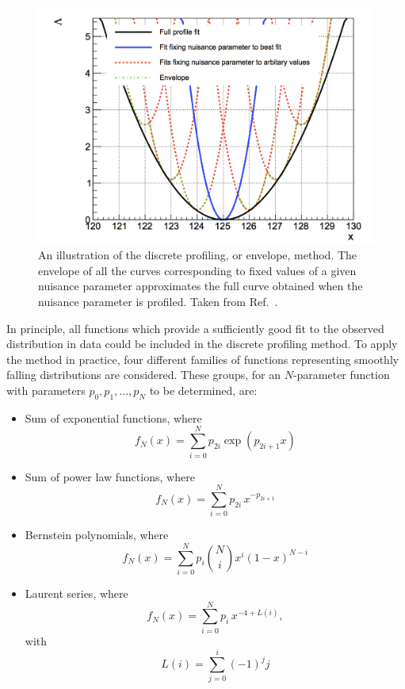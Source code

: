 \begin{figure}[hptb]
\centering
\includegraphics[width=\textwidth]{Figures/SigBkg/EnvelopeIllustration.pdf}
\caption{
  An illustration of the discrete profiling, or envelope, method.
  The envelope of all the curves corresponding to fixed values of a given nuisance parameter
  approximates the full curve obtained when the nuisance parameter is profiled.
  Taken from Ref.~\cite{Envelope}.
}
\label{fig:sigbkg_envelope}
\end{figure}

In principle, all functions which provide a sufficiently good fit to the observed \mgg distribution
in data could be included in the discrete profiling method.
To apply the method in practice, 
four different families of functions representing smoothly falling distributions are considered.
These groups, 
for an $N$-parameter function with parameters $p_0, p_1, ..., p_N$ to be determined, are: 
\begin{itemize}
\item Sum of exponential functions, where
\begin{equation*}
f_N(x) = \sum_{i=0}^{N} p_{2i}\exp{\left(p_{2i+1}x\right)}
\end{equation*}
\item Sum of power law functions, where
\begin{equation*}
f_N(x) = \sum_{i=0}^{N} p_{2i}\,x^{-p_{2i+1}}
\end{equation*}
\item Bernstein polynomials, where
\begin{equation*}
f_N(x) = \sum_{i=0}^{N} p_{i}\binom{N}{i}x^{i}\left(1-x\right)^{N-i}
\end{equation*}
\item Laurent series, where
\begin{equation*}
f_N(x) = \sum_{i=0}^{N} p_{i}\,x^{-4 + L(i)},
\end{equation*}
with
\begin{equation*}
L(i) = \sum_{j=0}^{i}(-1)^j j
\end{equation*}
\end{itemize}

